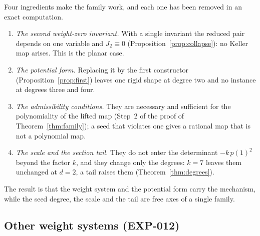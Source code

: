 \documentclass[11pt]{article}
\theoremstyle{definition}
\theoremstyle{remark}
\begin{document}
Four ingredients make the family work, and each one has been removed in an exact computation.
\begin{enumerate}
\item \emph{The second weight-zero invariant.} With a single invariant the reduced pair depends on one variable and $J_2 \equiv 0$ (Proposition~\ref{prop:collapse}): no Keller map arises. This is the planar case.
\item \emph{The potential form.} Replacing it by the first constructor (Proposition~\ref{prop:first}) leaves one rigid shape at degree two and no instance at degrees three and four.
\item \emph{The admissibility conditions.} They are necessary and sufficient for the polynomiality of the lifted map (Step~2 of the proof of Theorem~\ref{thm:family}); a seed that violates one gives a rational map that is not a polynomial map.
\item \emph{The scale and the section tail.} They do not enter the determinant $-k\,p(1)^2$ beyond the factor $k$, and they change only the degrees: $k = 7$ leaves them unchanged at $d = 2$, a tail raises them (Theorem~\ref{thm:degrees}).
\end{enumerate}
The result is that the weight system and the potential form carry the mechanism, while the seed degree, the scale and the tail are free axes of a single family.

\subsection{Other weight systems (EXP-012)}

\begin{table}[t]\centering\small

\caption{Weight systems $(1,-1,-m)$ scanned for counterexample families, read from the stored outputs of EXP-012: the weight $m$, the output weights $o$, the class tested and the outcome. Only $m = 2$ yields a family that collides.}
\label{tab:landscape}
\end{table}
\end{document}
